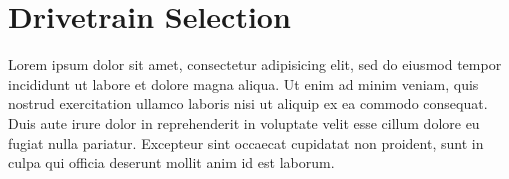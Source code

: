 

\section{Drivetrain Selection} %
\label{sec:drivetrain}
Lorem ipsum dolor sit amet, consectetur adipisicing elit, sed do eiusmod
tempor incididunt ut labore et dolore magna aliqua. Ut enim ad minim veniam,
quis nostrud exercitation ullamco laboris nisi ut aliquip ex ea commodo
consequat. Duis aute irure dolor in reprehenderit in voluptate velit esse
cillum dolore eu fugiat nulla pariatur. Excepteur sint occaecat cupidatat non
proident, sunt in culpa qui officia deserunt mollit anim id est laborum.

